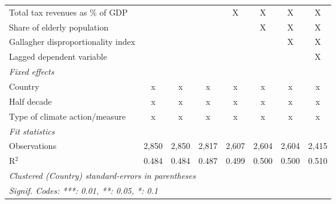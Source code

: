 \begin{table}[htbp]
\begin{tabular}{lccccccc}
      Total tax revenues as \% of GDP                                 &                &                &                & X             & X             & X             & X\\  
      Share of elderly population                                     &                &                &                &               & X             & X             & X\\  
      Gallagher disproportionality index                              &                &                &                &               &               & X             & X\\  
      Lagged dependent variable                                       &                &                &                &               &               &               & X\\  
      \emph{Fixed effects}\\
      Country                                                         & x              & x              & x              & x             & x             & x             & x\\  
      Half decade                                                     & x              & x              & x              & x             & x             & x             & x\\  
      Type of climate action/measure                                  & x              & x              & x              & x             & x             & x             & x\\  
      \midrule \emph{Fit statistics}\\
      Observations                                                    & 2,850          & 2,850          & 2,817          & 2,607         & 2,604         & 2,604         & 2,415\\  
      R$^2$                                                           & 0.484          & 0.484          & 0.487          & 0.499         & 0.500         & 0.500         & 0.510\\  
      \midrule
      \multicolumn{8}{l}{\emph{Clustered (Country) standard-errors in parentheses}}\\
      \multicolumn{8}{l}{\emph{Signif. Codes: ***: 0.01, **: 0.05, *: 0.1}}\\
   \end{tabular}
\end{table}


